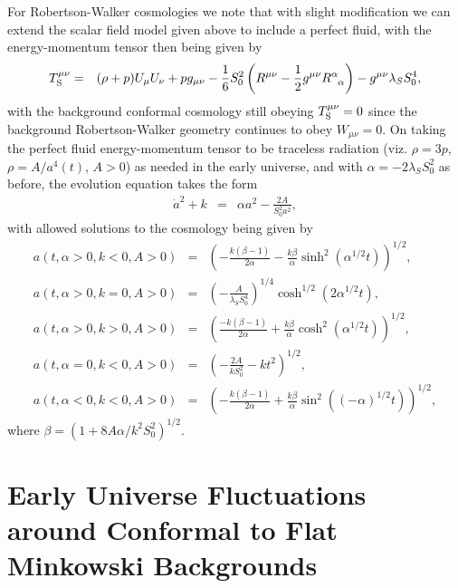 \documentclass[aps]{revtex4}
\begin{document}
For Robertson-Walker cosmologies we note that with slight modification we can extend the scalar field model given above to include a perfect fluid, with the energy-momentum tensor then being given by \cite{Mannheim1998}
%                                                                               
\begin{eqnarray}
T_{\rm S}^{\mu \nu}&=&(\rho+p)U_{\mu}U_{\nu}+pg_{\mu\nu} 
-\frac{1}{6} S_0^2\left(R^{\mu\nu}-\frac{1}{2}g^{\mu\nu}
R^\alpha_{\phantom{\alpha}\alpha}\right)-g^{\mu\nu}\lambda_S S_0^4,
\label{A17}
\end{eqnarray}                                 
%
with the background conformal cosmology still obeying $T_{\rm S}^{\mu \nu}=0$ since the background  Robertson-Walker geometry continues to obey $W_{\mu\nu}=0$.  On taking the perfect fluid energy-momentum tensor to be traceless radiation  (viz. $\rho=3p$, $\rho=A/a^4(t)$, $A>0$) as needed in the early universe, and with $\alpha =-2\lambda_{S}S^2_0$ as before, the evolution equation takes the form
\begin{eqnarray}
\dot{a}^2+k&=&\alpha a^2-\frac{2A}{S_0^2a^2},
\label{A18}
\end{eqnarray}                                 
% 
with allowed solutions to the cosmology being given by  \cite{Mannheim1998} 
%
\begin{eqnarray}
a(t,\alpha>0,k<0,A>0)&=&\left(-\frac{k(\beta-1)}{2\alpha}-\frac{k\beta}{\alpha}\sinh^2(\alpha^{1/2}t)\right)^{1/2},
\nonumber \\
a(t,\alpha>0,k=0,A>0)&=&\left(-\frac{A}{\lambda_S S_0^4}\right)^{1/4}\cosh^{1/2}(2\alpha^{1/2}t),
\nonumber \\
a(t,\alpha>0,k>0,A>0)&=&\left(\frac{-k(\beta-1)}{2\alpha}+\frac{k\beta}{\alpha}\cosh^2(\alpha^{1/2}t)\right)^{1/2},
\nonumber\\
a(t,\alpha=0,k<0,A>0)&=&\left(-\frac{2A}{kS_0^2}-kt^2\right)^{1/2},
\nonumber \\
a(t,\alpha<0,k<0,A>0)&=&\left(-\frac{k(\beta-1)}{2\alpha}+\frac{k\beta}{\alpha}\sin^2((-\alpha)^{1/2}t)\right)^{1/2},
\label{A19}
\end{eqnarray}
%
where $\beta=(1+8A\alpha/k^2S_0^2)^{1/2}$.



\section{Early Universe Fluctuations around Conformal to Flat Minkowski Backgrounds}
\label{SB}
\end{document}
